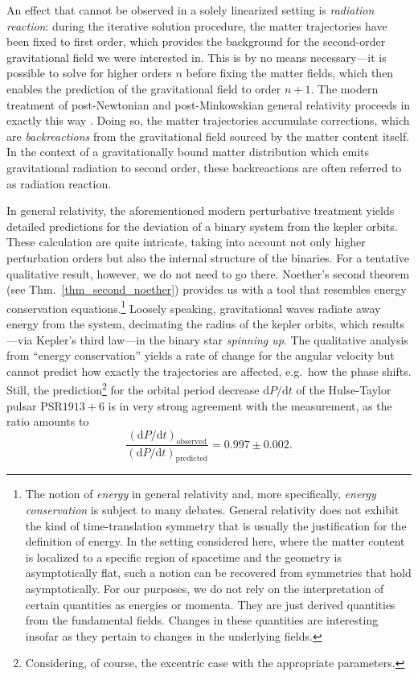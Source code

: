 An effect that cannot be observed in a solely linearized setting is \emph{radiation reaction}: during the iterative solution procedure, the matter trajectories have been fixed to first order, which provides the background for the second-order gravitational field we were interested in. This is by no means necessary---it is possible to solve for higher orders $n$ before fixing the matter fields, which then enables the prediction of the gravitational field to order $n+1$. The modern treatment of post-Newtonian and post-Minkowskian general relativity proceeds in exactly this way \cite{poisson2014gravity}. Doing so, the matter trajectories accumulate corrections, which are \emph{backreactions} from the gravitational field sourced by the matter content itself. In the context of a gravitationally bound matter distribution which emits gravitational radiation to second order, these backreactions are often referred to as radiation reaction.

In general relativity, the aforementioned modern perturbative treatment yields detailed predictions for the deviation of a binary system from the kepler orbits. These calculation are quite intricate, taking into account not only higher perturbation orders but also the internal structure of the binaries. For a tentative qualitative result, however, we do not need to go there. Noether's second theorem (see Thm.~\ref{thm_second_noether}) provides us with a tool that resembles energy conservation equations.\footnote{The notion of \emph{energy} in general relativity and, more specifically, \emph{energy conservation} is subject to many debates. General relativity does not exhibit the kind of time-translation symmetry that is usually the justification for the definition of energy. In the setting considered here, where the matter content is localized to a specific region of spacetime and the geometry is asymptotically flat, such a notion can be recovered from symmetries that hold asymptotically. \cite{} For our purposes, we do not rely on the interpretation of certain quantities as energies or momenta. They are just derived quantities from the fundamental fields. Changes in these quantities are interesting insofar as they pertain to changes in the underlying fields.} Loosely speaking, gravitational waves radiate away energy from the system, decimating the radius of the kepler orbits, which results---via Kepler's third law---in the binary star \emph{spinning up}. The qualitative analysis from ``energy conservation'' yields a rate of change for the angular velocity but cannot predict how exactly the trajectories are affected, e.g.~how the phase shifts. Still, the prediction\footnote{Considering, of course, the excentric case with the appropriate parameters.} for the orbital period decrease $\mathrm dP/\mathrm dt$ of the Hulse-Taylor pulsar $\text{PSR} 1913+6$ is in very strong agreement with the measurement, as the ratio amounts to \cite{poisson2014gravity}
\begin{equation}
  \frac{(\mathrm dP/\mathrm dt)_\text{observed}}{(\mathrm dP/\mathrm dt)_\text{predicted}} = 0.997 \pm 0.002.
\end{equation}

